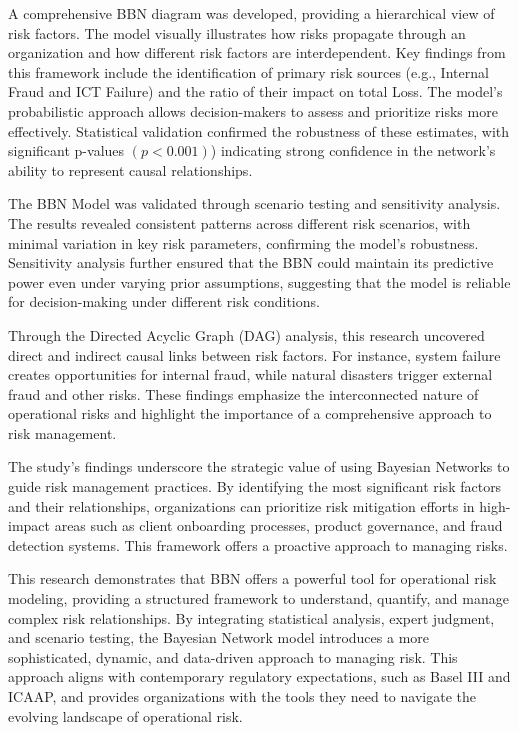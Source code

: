 A comprehensive BBN diagram was developed, providing a hierarchical view of risk factors. The model visually illustrates how risks propagate through an organization and how different risk factors are interdependent. Key findings from this framework include the identification of primary risk sources (e.g., Internal Fraud and ICT Failure) and the ratio of their impact on total Loss. The model’s probabilistic approach allows decision-makers to assess and prioritize risks more effectively. Statistical validation confirmed the robustness of these estimates, with significant p-values $(p < 0.001)$) indicating strong confidence in the network’s ability to represent causal relationships.

The BBN Model was validated through scenario testing and sensitivity analysis. The results revealed consistent patterns across different risk scenarios, with minimal variation in key risk parameters, confirming the model's robustness. Sensitivity analysis further ensured that the BBN could maintain its predictive power even under varying prior assumptions, suggesting that the model is reliable for decision-making under different risk conditions.

Through the Directed Acyclic Graph (DAG) analysis, this research uncovered direct and indirect causal links between risk factors. For instance, system failure creates opportunities for internal fraud, while natural disasters trigger external fraud and other risks. These findings emphasize the interconnected nature of operational risks and highlight the importance of a comprehensive approach to risk management.

The study's findings underscore the strategic value of using Bayesian Networks to guide risk management practices. By identifying the most significant risk factors and their relationships, organizations can prioritize risk mitigation efforts in high-impact areas such as client onboarding processes, product governance, and fraud detection systems. This framework offers a proactive approach to managing risks.

This research demonstrates that BBN offers a powerful tool for operational risk modeling, providing a structured framework to understand, quantify, and manage complex risk relationships. By integrating statistical analysis, expert judgment, and scenario testing, the Bayesian Network model introduces a more sophisticated, dynamic, and data-driven approach to managing risk. This approach aligns with contemporary regulatory expectations, such as Basel III and ICAAP, and provides organizations with the tools they need to navigate the evolving landscape of operational risk.
